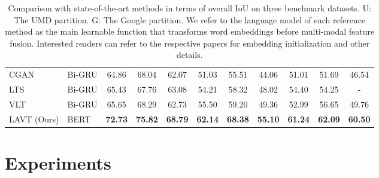 \documentclass[10pt,twocolumn,letterpaper]{article}
\begin{document}
\begin{table*}[t]
{\begin{tabular}{l|l|c|c|c|c|c|c|c|c|c}
      CGAN~\cite{luo2020cascade}    & Bi-GRU & 64.86 & 68.04 & 62.07 & 51.03 & 55.51 & 44.06 & 51.01 & 51.69 & 46.54 \\
      LTS~\cite{Jing_2021_Locate}   & Bi-GRU & 65.43 & 67.76 & 63.08 & 54.21 & 58.32 & 48.02 & 54.40 & 54.25 & - \\
      VLT~\cite{Ding_2021_vlt}      & Bi-GRU & 65.65 & 68.29 & 62.73 & 55.50 & 59.20 & 49.36 & 52.99 & 56.65 & 49.76 \\
      \hline
      LAVT (Ours) & BERT & \textbf{72.73} & \textbf{75.82} & \textbf{68.79} & \textbf{62.14} & \textbf{68.38} & \textbf{55.10} & \textbf{61.24} & \textbf{62.09} & \textbf{60.50} \\
      \bottomrule[1pt]
   \end{tabular}}
   \caption{Comparison with state-of-the-art methods in terms of overall IoU on three benchmark datasets. U: The UMD partition. G: The Google partition. We refer to the language model of each reference method as the main learnable function that transforms word embeddings before multi-modal feature fusion. Interested readers can refer to the respective papers for embedding initialization and other details.}
   \label{tab:1}
\end{table*}


\section{Experiments}
\label{sec:experiment}
\end{document}

